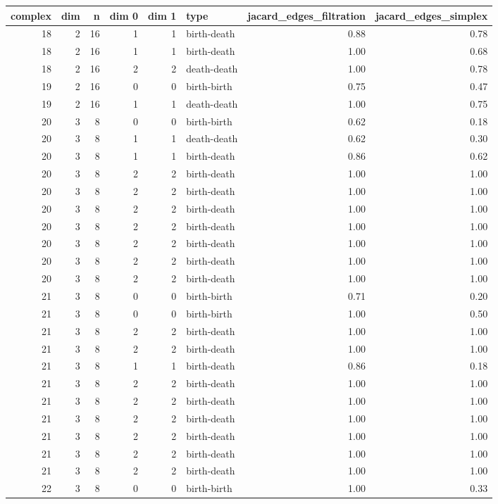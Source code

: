 \documentclass{article}
\begin{document}
\begin{center}
\begin{tabular}{rrrrrlrr}
\toprule
complex & dim & n & dim 0 & dim 1 & type & jacard\_edges\_filtration & jacard\_edges\_simplex \\
\midrule
18 & 2 & 16 & 1 & 1 & birth-death & 0.88 & 0.78 \\
18 & 2 & 16 & 1 & 1 & birth-death & 1.00 & 0.68 \\
18 & 2 & 16 & 2 & 2 & death-death & 1.00 & 0.78 \\
19 & 2 & 16 & 0 & 0 & birth-birth & 0.75 & 0.47 \\
19 & 2 & 16 & 1 & 1 & death-death & 1.00 & 0.75 \\
20 & 3 & 8 & 0 & 0 & birth-birth & 0.62 & 0.18 \\
20 & 3 & 8 & 1 & 1 & death-death & 0.62 & 0.30 \\
20 & 3 & 8 & 1 & 1 & birth-death & 0.86 & 0.62 \\
20 & 3 & 8 & 2 & 2 & birth-death & 1.00 & 1.00 \\
20 & 3 & 8 & 2 & 2 & birth-death & 1.00 & 1.00 \\
20 & 3 & 8 & 2 & 2 & birth-death & 1.00 & 1.00 \\
20 & 3 & 8 & 2 & 2 & birth-death & 1.00 & 1.00 \\
20 & 3 & 8 & 2 & 2 & birth-death & 1.00 & 1.00 \\
20 & 3 & 8 & 2 & 2 & birth-death & 1.00 & 1.00 \\
20 & 3 & 8 & 2 & 2 & birth-death & 1.00 & 1.00 \\
21 & 3 & 8 & 0 & 0 & birth-birth & 0.71 & 0.20 \\
21 & 3 & 8 & 0 & 0 & birth-birth & 1.00 & 0.50 \\
21 & 3 & 8 & 2 & 2 & birth-death & 1.00 & 1.00 \\
21 & 3 & 8 & 2 & 2 & birth-death & 1.00 & 1.00 \\
21 & 3 & 8 & 1 & 1 & birth-death & 0.86 & 0.18 \\
21 & 3 & 8 & 2 & 2 & birth-death & 1.00 & 1.00 \\
21 & 3 & 8 & 2 & 2 & birth-death & 1.00 & 1.00 \\
21 & 3 & 8 & 2 & 2 & birth-death & 1.00 & 1.00 \\
21 & 3 & 8 & 2 & 2 & birth-death & 1.00 & 1.00 \\
21 & 3 & 8 & 2 & 2 & birth-death & 1.00 & 1.00 \\
21 & 3 & 8 & 2 & 2 & birth-death & 1.00 & 1.00 \\
22 & 3 & 8 & 0 & 0 & birth-birth & 1.00 & 0.33 \\

\end{tabular}
\end{center}
\end{document}
